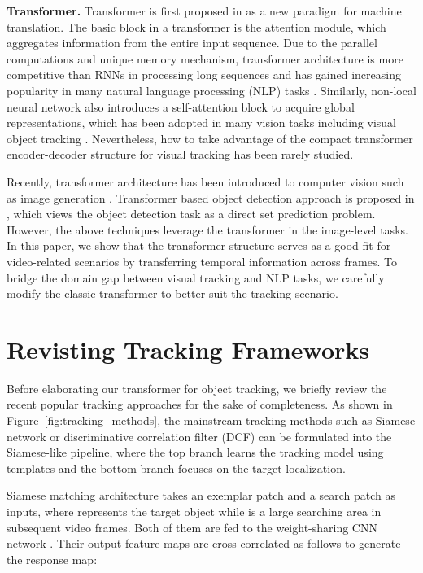 \documentclass[10pt,twocolumn,letterpaper]{article}
\begin{document}
{\noindent \bf Transformer.} Transformer is first proposed in \cite{Transformer} as a new paradigm for machine translation.
The basic block in a transformer is the attention module, which aggregates information from the entire input sequence.
Due to the parallel computations and unique memory mechanism, transformer architecture is more competitive than RNNs in processing long sequences and has gained increasing popularity in many natural language processing (NLP) tasks \cite{BERT,language2019,end-to-endASR}.   
Similarly, non-local neural network \cite{nonlocal} also introduces a self-attention block to acquire global representations, which has been adopted in many vision tasks including visual object tracking \cite{DeformableSiam}.
Nevertheless, how to take advantage of the compact transformer encoder-decoder structure for visual tracking has been rarely studied.



Recently, transformer architecture has been introduced to computer vision such as image generation \cite{ImageTransformer}. 
Transformer based object detection approach is proposed in \cite{DETR}, which views the object detection task as a direct set prediction problem. 
However, the above techniques leverage the transformer in the image-level tasks.
In this paper, we show that the transformer structure serves as a good fit for video-related scenarios by transferring temporal information across frames.
To bridge the domain gap between visual tracking and NLP tasks, we carefully modify the classic transformer to better suit the tracking scenario. 



\section{Revisting Tracking Frameworks}\label{revisiting tracking}
Before elaborating our transformer for object tracking, we briefly review the recent popular tracking approaches for the sake of completeness.
As shown in Figure~\ref{fig:tracking_methods}, the mainstream tracking methods such as Siamese network \cite{SiamFC} or discriminative correlation filter (DCF) \cite{CFNet,ATOM,DiMP} can be formulated into the Siamese-like pipeline, where the top branch learns the tracking model using templates and the bottom branch focuses on the target localization.




Siamese matching architecture \cite{SiamFC} takes an exemplar patch  and a search patch  as inputs, where  represents the target object while  is a large searching area in subsequent video frames. 
Both of them are fed to the weight-sharing CNN network . 
Their output feature maps are cross-correlated as follows to generate the response map:
\end{document}
